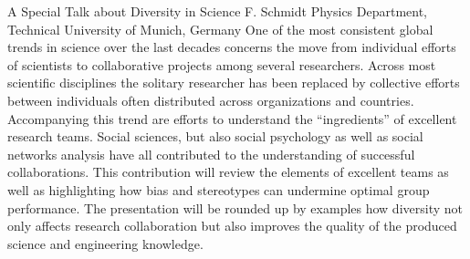 
    \begin{abstract_online}{A Special Talk about Diversity in Science}{%
        F. Schmidt}{%
        \ITtag}{%
        Physics Department, Technical University of Munich, Germany}
    One of the most consistent global trends in science over the last decades concerns the move from individual efforts of scientists to collaborative projects among several researchers. Across most scientific disciplines the solitary researcher has been replaced by collective efforts between individuals often distributed across organizations and countries. Accompanying this trend are efforts to understand the “ingredients” of excellent research teams. Social sciences, but also social psychology as well as social networks analysis have all contributed to the understanding of successful collaborations. This contribution will review the elements of excellent teams as well as highlighting how bias and stereotypes can undermine optimal group performance. The presentation will be rounded up by examples how diversity not only affects research collaboration but also improves the quality of the produced science and engineering knowledge. 
    
    \end{abstract_online}
    